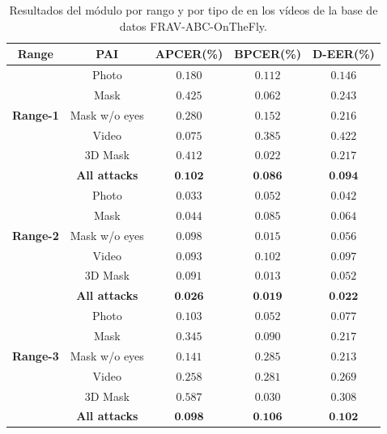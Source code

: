 \begin{table}[t!]
\centering
\begin{tabular}{|c|c|c|c|c|}
\hline
\textbf{Range} & \textbf{PAI} & \textbf{APCER(\%)} & \textbf{BPCER(\%)} & \textbf{D-EER(\%)} \\ \hline 
\multirow{5}{*}{\textbf{Range-1}} &Photo& $0.180$ & $0.112$ & $0.146$ \\ \cline{2-5} 
                                  &Mask & $0.425$ & 0.062 & $0.243$ \\ \cline{2-5} 
                                  & Mask w/o eyes& $0.280$ & $0.152$ & $0.216$ \\ \cline{2-5} 
                                  & Video   & $0.075$ & $0.385$ & $0.422$ \\ \cline{2-5} 
                                  & $3$D Mask & $0.412$ & $0.022$ & $0.217$ \\ \cline{2-5}
                                  & \textbf{All attacks} & $\textbf{0.102}$ & $\textbf{0.086}$ & $\textbf{0.094}$ \\ \hline
\multirow{5}{*}{\textbf{Range-2}} &Photo& $0.033$ & $0.052$ & $0.042$ \\ \cline{2-5} 
                                  &Mask& $0.044$ & $0.085$ & $0.064$ \\ \cline{2-5} 
                                  &Mask w/o eyes& $0.098$ & $0.015$ & $0.056$ \\ \cline{2-5} 
                                  &Video& $0.093$ & $0.102$ & $0.097$ \\ \cline{2-5} 
                                  & $3$D Mask & $0.091$ & $0.013$ & $0.052$ \\ \cline{2-5}
                                  & \textbf{All attacks} & $\textbf{0.026}$ & $\textbf{0.019}$ & $\textbf{0.022}$ \\ \hline
\multirow{5}{*}{\textbf{Range-3}} &Photo & $0.103$ & $0.052$ & $0.077$ \\ \cline{2-5} 
                                  &Mask& $0.345$ & $0.090$ & $0.217$ \\ \cline{2-5} 
                                  &Mask w/o eyes& $0.141$ & $0.285$ & $0.213$ \\ \cline{2-5} 
                                  &Video& $0.258$ & $0.281$ & $0.269$ \\ \cline{2-5} 
                                  &$3$D Mask& $0.587$ & $0.030$ & $0.308$ \\ \cline{2-5}
                                  & \textbf{All attacks} & $\textbf{0.098}$ & $\textbf{0.106}$ & $\textbf{0.102}$ \\ \hline
\end{tabular}
\caption{Resultados del módulo  por rango y por tipo de  en los vídeos de la base de datos \Gls{FRAV-ABC-OnTheFly}.}
\label{tab:result_PAD_Database}
\end{table}


